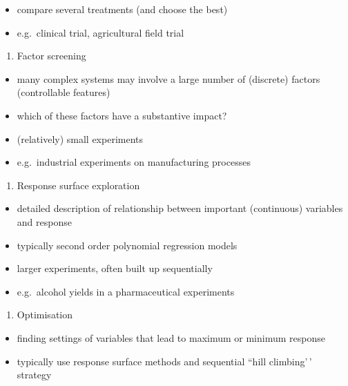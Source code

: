 \documentclass[
]{book}
\providecommand{\tightlist}{%
  \setlength{\itemsep}{0pt}\setlength{\parskip}{0pt}}
\theoremstyle{definition}
\theoremstyle{definition}
\theoremstyle{definition}
\theoremstyle{definition}
\theoremstyle{remark}
\begin{document}
\begin{itemize}
\tightlist
\item
  compare several treatments (and choose the best)
\item
  e.g.~clinical trial, agricultural field trial
\end{itemize}

\begin{enumerate}
\def\labelenumi{\arabic{enumi}.}
\setcounter{enumi}{1}
\tightlist
\item
  Factor screening
\end{enumerate}

\begin{itemize}
\tightlist
\item
  many complex systems may involve a large number of (discrete) factors (controllable features)
\item
  which of these factors have a substantive impact?
\item
  (relatively) small experiments
\item
  e.g.~industrial experiments on manufacturing processes
\end{itemize}

\begin{enumerate}
\def\labelenumi{\arabic{enumi}.}
\setcounter{enumi}{2}
\tightlist
\item
  Response surface exploration
\end{enumerate}

\begin{itemize}
\tightlist
\item
  detailed description of relationship between important (continuous) variables and response
\item
  typically second order polynomial regression models
\item
  larger experiments, often built up sequentially
\item
  e.g.~alcohol yields in a pharmaceutical experiments
\end{itemize}

\begin{enumerate}
\def\labelenumi{\arabic{enumi}.}
\setcounter{enumi}{3}
\tightlist
\item
  Optimisation
\end{enumerate}

\begin{itemize}
\tightlist
\item
  finding settings of variables that lead to maximum or minimum response
\item
  typically use response surface methods and sequential ``hill climbing'\,' strategy
\end{itemize}
\end{document}
